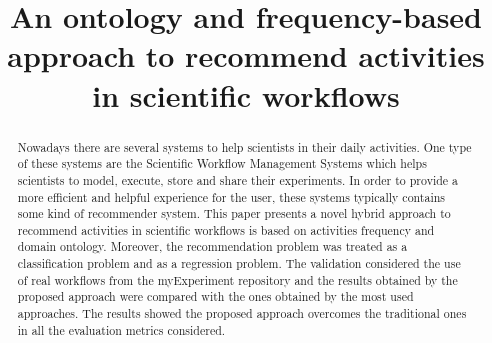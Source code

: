 \documentclass{sig-alternate-05-2015}
\begin{document}






%

\title{An ontology and frequency-based approach to recommend activities in scientific workflows}


\author{
}

\maketitle
\begin{abstract}
Nowadays there are several systems to help scientists in their daily activities. One type of these systems are the Scientific Workflow Management Systems which helps scientists to model, execute, store and share their experiments. In order to provide a more efficient and helpful experience for the user, these systems typically contains some kind of recommender system.
This paper presents a novel hybrid approach to recommend activities in scientific workflows is based on activities frequency and domain ontology. Moreover, the recommendation problem was treated as a classification problem and as a regression problem. The validation considered the use of real workflows from the myExperiment repository and the results obtained by the proposed approach were compared with the ones obtained by the most used approaches.
The results showed the proposed approach overcomes the traditional ones in all the evaluation metrics considered.
\end{abstract}
\end{document}
